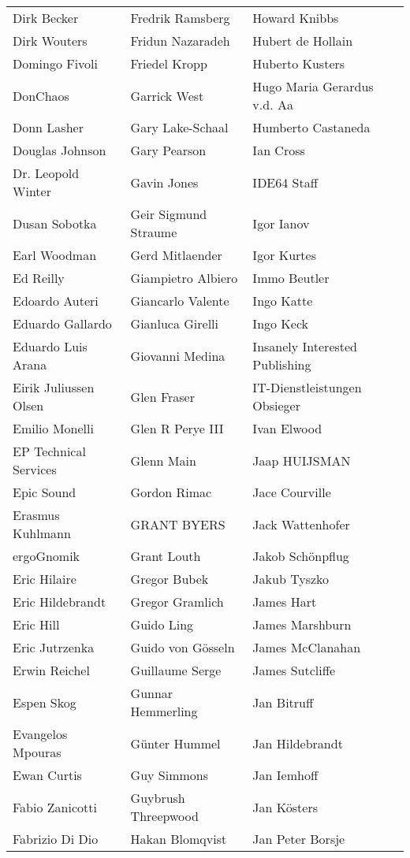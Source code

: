 \begin{small}
\begin{tabular}{p{4cm}p{4cm}p{4cm}}
Dirk Becker & Fredrik Ramsberg & Howard Knibbs \\
Dirk Wouters & Fridun Nazaradeh & Hubert de Hollain \\
Domingo Fivoli & Friedel Kropp & Huberto Kusters \\
DonChaos & Garrick West & Hugo Maria Gerardus v.d. Aa \\
Donn Lasher & Gary Lake-Schaal & Humberto Castaneda \\
Douglas Johnson & Gary Pearson & Ian Cross \\
Dr. Leopold Winter & Gavin Jones & IDE64 Staff \\
Dusan Sobotka & Geir Sigmund Straume & Igor Ianov \\
Earl Woodman & Gerd Mitlaender & Igor Kurtes \\
Ed Reilly & Giampietro Albiero & Immo Beutler \\
Edoardo Auteri & Giancarlo Valente & Ingo Katte \\
Eduardo Gallardo & Gianluca Girelli & Ingo Keck \\
Eduardo Luis Arana & Giovanni Medina & Insanely Interested Publishing \\
Eirik Juliussen Olsen & Glen Fraser & IT-Dienstleistungen Obsieger \\
Emilio Monelli & Glen R Perye III & Ivan Elwood \\
EP Technical Services & Glenn Main & Jaap HUIJSMAN \\
Epic Sound & Gordon Rimac & Jace Courville \\
Erasmus Kuhlmann & GRANT BYERS & Jack Wattenhofer \\
ergoGnomik & Grant Louth & Jakob Schönpflug \\
Eric Hilaire & Gregor Bubek & Jakub Tyszko \\
Eric Hildebrandt & Gregor Gramlich & James Hart \\
Eric Hill & Guido Ling & James Marshburn \\
Eric Jutrzenka & Guido von Gösseln & James McClanahan \\
Erwin Reichel & Guillaume Serge & James Sutcliffe \\
Espen Skog & Gunnar Hemmerling & Jan Bitruff \\
Evangelos Mpouras & Günter Hummel & Jan Hildebrandt \\
Ewan Curtis & Guy Simmons & Jan Iemhoff \\
Fabio Zanicotti & Guybrush Threepwood & Jan Kösters \\
Fabrizio Di Dio & Hakan Blomqvist & Jan Peter Borsje \\

\end{tabular}
\end{small}
